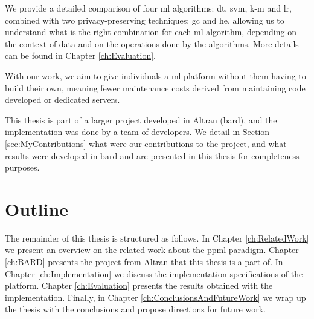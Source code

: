 We provide a detailed comparison of four \ac{ml} algorithms: \ac{dt}, \ac{svm}, \ac{k-m} and \ac{lr}, combined with two privacy-preserving techniques: \ac{gc} and \ac{he}, allowing us to understand what is the right combination for each \ac{ml} algorithm, depending on the context of data and on the operations done by the algorithms. More details can be found in Chapter \ref{ch:Evaluation}.

With our work, we aim to give individuals a \ac{ml} platform without them having to build their own, meaning fewer maintenance costs derived from maintaining code developed or dedicated servers.


This thesis is part of a larger project developed in Altran (\ac{bard}), and the implementation was done by a team of developers. We detail in Section \ref{sec:MyContributions} what were our contributions to the project, and what results were developed in \ac{bard} and are presented in this thesis for completeness purposes.



\section{Outline}
\label{sec:Intro_StructureOfThisDocument}
The remainder of this thesis is structured as follows.
In Chapter \ref{ch:RelatedWork} we present an overview on the related work about the \ac{ppml} paradigm.
Chapter \ref{ch:BARD} presents the project from Altran that this thesis is a part of.
In Chapter \ref{ch:Implementation} we discuss the implementation specifications of the platform.
Chapter \ref{ch:Evaluation} presents the results obtained with the implementation.
Finally, in Chapter \ref{ch:ConclusionsAndFutureWork} we wrap up the thesis with the conclusions and propose directions for future work.

